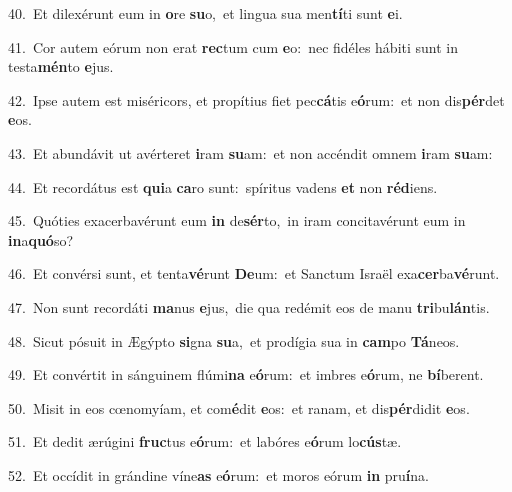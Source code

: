 {\numbfont\textcolor{\numbcolor}{40.}}~Et dilexérunt eum in \textbf{o}\-re \textbf{su}\-o,~\star et lingua sua men\-\textbf{tí}\-ti sunt \textbf{e}\-i.\par
{\numbfont\textcolor{\numbcolor}{41.}}~Cor autem eórum non erat \textbf{rec}\-tum cum \textbf{e}\-o:~\star nec fidéles hábiti sunt in testa\-\textbf{mén}\-to \textbf{e}\-jus.\par
{\numbfont\textcolor{\numbcolor}{42.}}~Ipse autem est miséricors, et propítius fiet pec\-\textbf{cá}\-tis e\-\textbf{ó}\-rum:~\star et non dis\-\textbf{pér}\-det \textbf{e}\-os.\par
{\numbfont\textcolor{\numbcolor}{43.}}~Et abundávit ut avérteret \textbf{i}\-ram \textbf{su}\-am:~\star et non accéndit omnem \textbf{i}\-ram \textbf{su}\-am:\par
{\numbfont\textcolor{\numbcolor}{44.}}~Et recordátus est \textbf{qui}\-a \textbf{ca}\-ro sunt:~\star spíritus vadens \textbf{et} non \textbf{réd}\-iens.\par
{\numbfont\textcolor{\numbcolor}{45.}}~Quóties exacerbavérunt eum \textbf{in} de\-\textbf{sér}\-to,~\star in iram concitavérunt eum in \textbf{in}\-a\-\textbf{quó}\-so?\par
{\numbfont\textcolor{\numbcolor}{46.}}~Et convérsi sunt, et tenta\-\textbf{vé}\-runt \textbf{De}\-um:~\star et Sanctum Israël exa\-\textbf{cer}\-ba\-\textbf{vé}\-runt.\par
{\numbfont\textcolor{\numbcolor}{47.}}~Non sunt recordáti \textbf{ma}\-nus \textbf{e}\-jus,~\star die qua redémit eos de manu \textbf{tri}\-bu\-\textbf{lán}\-tis.\par
{\numbfont\textcolor{\numbcolor}{48.}}~Sicut pósuit in Ægýpto \textbf{si}\-gna \textbf{su}\-a,~\star et prodígia sua in \textbf{cam}\-po \textbf{Tá}\-neos.\par
{\numbfont\textcolor{\numbcolor}{49.}}~Et convértit in sánguinem flúmi\textbf{na} e\-\textbf{ó}\-rum:~\star et imbres e\-\textbf{ó}\-rum, ne \textbf{bí}\-berent.\par
{\numbfont\textcolor{\numbcolor}{50.}}~Misit in eos cœnomyíam, et com\-\textbf{é}\-dit \textbf{e}\-os:~\star et ranam, et dis\-\textbf{pér}\-didit \textbf{e}\-os.\par
{\numbfont\textcolor{\numbcolor}{51.}}~Et dedit ærúgini \textbf{fruc}\-tus e\-\textbf{ó}\-rum:~\star et labóres e\-\textbf{ó}\-rum lo\-\textbf{cús}\-tæ.\par
{\numbfont\textcolor{\numbcolor}{52.}}~Et occídit in grándine víne\textbf{as} e\-\textbf{ó}\-rum:~\star et moros eórum \textbf{in} pru\-\textbf{í}\-na.\par
